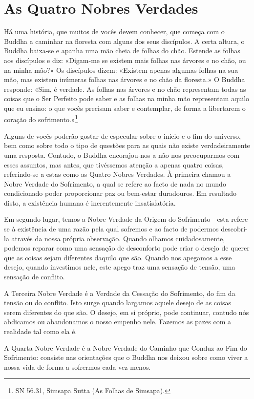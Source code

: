 \chapter{As Quatro Nobres Verdades}

Há uma história, que muitos de vocês devem conhecer, que começa com o
Buddha a caminhar na floresta com alguns dos seus discípulos. A certa
altura, o Buddha baixa-se e apanha uma mão cheia de folhas do chão.
Estende as folhas aos discípulos e diz: «Digam-me se existem mais folhas
nas árvores e no chão, ou na minha mão?» Os discípulos dizem: «Existem
apenas algumas folhas na sua mão, mas existem inúmeras folhas nas
árvores e no chão da floresta.» O Buddha responde: «Sim, é verdade. As
folhas nas árvores e no chão representam todas as coisas que o Ser
Perfeito pode saber e as folhas na minha mão representam aquilo que eu
ensino: o que vocês precisam saber e contemplar, de forma a libertarem o
coração do sofrimento.»\footnote{SN 56.31, Simsapa Sutta (As Folhas de
  Simsapa).}

Alguns de vocês poderão gostar de especular sobre o início e o fim do
universo, bem como sobre todo o tipo de questões para as quais não
existe verdadeiramente uma resposta. Contudo, o Buddha encorajou-nos a
não nos preocuparmos com esses assuntos, mas antes, que tivéssemos
atenção a apenas quatro coisas, referindo-se a estas como as Quatro
Nobres Verdades. À primeira chamou a Nobre Verdade do Sofrimento, a qual
se refere ao facto de nada no mundo condicionado poder proporcionar paz
ou bem-estar duradouros. Em resultado disto, a existência humana é
inerentemente insatisfatória.

Em segundo lugar, temos a Nobre Verdade da Origem do Sofrimento - esta
refere-se à existência de uma razão pela qual sofremos e ao facto de
podermos descobri-la através da nossa própria observação. Quando olhamos
cuidadosamente, podemos reparar como uma sensação de desconforto pode
criar o desejo de querer que as coisas sejam diferentes daquilo que são.
Quando nos apegamos a esse desejo, quando investimos nele, este apego
traz uma sensação de tensão, uma sensação de conflito.

A Terceira Nobre Verdade é a Verdade da Cessação do Sofrimento, do fim
da tensão ou do conflito. Isto surge quando largamos aquele desejo de as
coisas serem diferentes do que são. O desejo, em si próprio, pode
continuar, contudo nós abdicamos ou abandonamos o nosso empenho nele.
Fazemos as pazes com a realidade tal como ela é.

A Quarta Nobre Verdade é a Nobre Verdade do Caminho que Conduz ao Fim do
Sofrimento: consiste nas orientações que o Buddha nos deixou sobre como
viver a nossa vida de forma a sofrermos cada vez menos.

